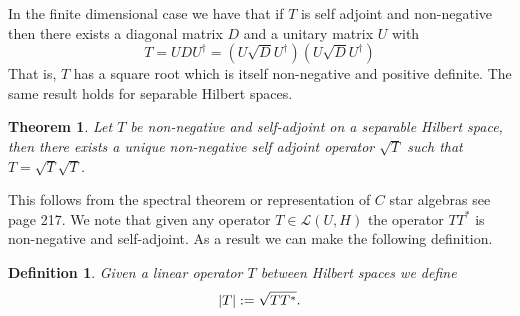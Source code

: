 \documentclass[12pt]{article}
\newcommand{\Ll}{\mathcal{L}}
\newtheorem{theorem}{Theorem}
\newtheorem{definition}{Definition}
\begin{document}
In the finite dimensional case we have that if $T$ is self adjoint and non-negative then there exists a diagonal matrix $D$ and a unitary matrix $U$ with
\begin{equation*}
	T=UDU^\dagger=(U\sqrt{D}U^\dagger)(U\sqrt{D}U^\dagger)
\end{equation*}
That is, $T$ has a square root which is itself non-negative and positive definite. The same result holds for separable Hilbert spaces.
\begin{theorem}
	Let $T$ be non-negative and self-adjoint on a separable Hilbert space, then there exists a unique non-negative self adjoint operator $\sqrt{T}$ such that $T=\sqrt{T}\sqrt{T}$.
\end{theorem}
This follows from the spectral theorem or representation of $C$ star algebras see \cite{lototsky2017stochastic} page 217. We note that given any operator $T\in \Ll(U,H)$ the operator $TT^*$ is non-negative and self-adjoint. As a result we can make the following definition.
\begin{definition}
	Given a linear operator $T$ between Hilbert spaces we define
	\begin{equation*}
		\abs{T}:=\sqrt{T T^*}  .
	\end{equation*}

\end{definition}
\end{document}
